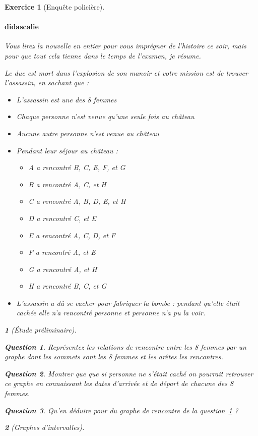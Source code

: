 \documentclass{article}
\theoremstyle{exostyle}
\newtheorem{exo}{Exercice}
\theoremstyle{partiestyle}
\newtheorem{partie}{}[exo]
\theoremstyle{questionstyle}
\newtheorem{questionpartie}{Question}[partie]
\begin{document}
\begin{exo}[Enquête policière]
		\paragraph{didascalie}{Vous lirez la nouvelle en entier pour vous imprégner de l'histoire ce soir, mais pour que tout cela tienne dans le temps de l'examen, je résume.}
	
	Le duc est mort dans l'explosion de son manoir et votre mission est de trouver l'assassin, en sachant que :
	\begin{itemize}
		\item L'assassin est une des 8 femmes
		\item Chaque personne n'est venue qu'une seule fois au château
		\item Aucune autre personne n'est venue au château
		\item Pendant leur séjour au château :
	\begin{itemize}
	\item A a rencontré B, C, E, F, et G
	\item B a rencontré A, C, et H
	\item C a rencontré A, B, D, E, et H
	\item D a rencontré C, et E
	\item E a rencontré A, C, D, et F
	\item F a rencontré A, et E
	\item G a rencontré A, et H
	\item H a rencontré B, C, et G
	\end{itemize}
	\item L'assassin a dû se cacher pour fabriquer la bombe : pendant qu'elle était cachée elle n'a rencontré personne et personne n'a pu la voir.
	\end{itemize}
	\begin{partie}[Étude préliminaire]
		\begin{questionpartie}
			\label{q1}
			Représentez les relations de rencontre entre les 8 femmes par un graphe dont les sommets sont les 8 femmes et les arêtes les rencontres.
		\end{questionpartie}
		\begin{questionpartie}
			Montrer que que si personne ne s'était caché on pourrait retrouver ce graphe en connaissant les dates d'arrivée et de départ de chacune des 8 femmes.
		\end{questionpartie}
		\begin{questionpartie}
			Qu'en déduire pour du graphe de rencontre de la question~\ref{q1} ?
		\end{questionpartie}
	\end{partie}
	\begin{partie}[Graphes d'intervalles]


\end{partie}
\end{exo}
\end{document}
